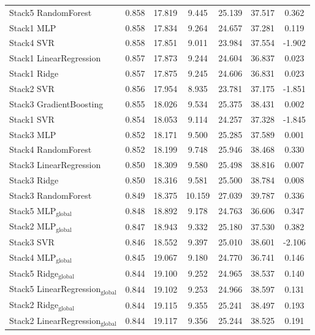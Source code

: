 \documentclass[a4paper,twocolumn]{article}
\begin{document}
\begin{table}
{\begin{tabular}{p{4.5cm}cccccc}
        Stack5 RandomForest & 0.858 & 17.819 & 9.445 & 25.139 & 37.517 & 0.362 \\
        Stack1 MLP & 0.858 & 17.834 & 9.264 & 24.657 & 37.281 & 0.119 \\
        Stack4 SVR & 0.858 & 17.851 & 9.011 & 23.984 & 37.554 & -1.902 \\
        Stack1 LinearRegression & 0.857 & 17.873 & 9.244 & 24.604 & 36.837 & 0.023 \\
        Stack1 Ridge & 0.857 & 17.875 & 9.245 & 24.606 & 36.831 & 0.023 \\
        Stack2 SVR & 0.856 & 17.954 & 8.935 & 23.781 & 37.175 & -1.851 \\
        Stack3 GradientBoosting & 0.855 & 18.026 & 9.534 & 25.375 & 38.431 & 0.002 \\
        Stack1 SVR & 0.854 & 18.053 & 9.114 & 24.257 & 37.328 & -1.845 \\
        Stack3 MLP & 0.852 & 18.171 & 9.500 & 25.285 & 37.589 & 0.001 \\
        Stack4 RandomForest & 0.852 & 18.199 & 9.748 & 25.946 & 38.468 & 0.330 \\
        Stack3 LinearRegression & 0.850 & 18.309 & 9.580 & 25.498 & 38.816 & 0.007 \\
        Stack3 Ridge & 0.850 & 18.316 & 9.581 & 25.500 & 38.784 & 0.008 \\
        Stack3 RandomForest & 0.849 & 18.375 & 10.159 & 27.039 & 39.787 & 0.336 \\
        Stack5 MLP$_{\text{global}}$ & 0.848 & 18.892 & 9.178 & 24.763 & 36.606 & 0.347 \\
        Stack2 MLP$_{\text{global}}$ & 0.847 & 18.943 & 9.332 & 25.180 & 37.530 & 0.382 \\
        Stack3 SVR & 0.846 & 18.552 & 9.397 & 25.010 & 38.601 & -2.106 \\
        Stack4 MLP$_{\text{global}}$ & 0.845 & 19.067 & 9.180 & 24.770 & 36.741 & 0.146 \\
        Stack5 Ridge$_{\text{global}}$ & 0.844 & 19.100 & 9.252 & 24.965 & 38.537 & 0.140 \\
        Stack5 LinearRegression$_{\text{global}}$ & 0.844 & 19.102 & 9.253 & 24.966 & 38.597 & 0.131 \\
        Stack2 Ridge$_{\text{global}}$ & 0.844 & 19.115 & 9.355 & 25.241 & 38.497 & 0.193 \\
        Stack2 LinearRegression$_{\text{global}}$ & 0.844 & 19.117 & 9.356 & 25.244 & 38.525 & 0.191 \\

\end{tabular}}
\end{table}
\end{document}
